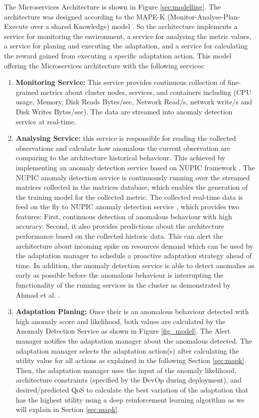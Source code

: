 \documentclass{ieeeaccess}
\begin{document}
The Microservices Architecture is shown in Figure \ref{sec:modelling}. The architecture was designed according to the MAPE-K (Monitor-Analyse-Plan-Execute over a shared Knowledge) model  \cite{computing2006architectural}. So the architecture  implements a service  for monitoring the environment, a service for analysing the metric values, a service for planing and executing the adaptation, and a service for calculating the reward gained from executing a specific adaptation action. This model offering the Microservices architecture with the following services: 
\begin{enumerate}
\item \textbf{Monitoring Service:} This service provides continuous collection of fine-grained metrics about cluster nodes, services, and containers including (CPU usage, Memory, Disk Reads Bytes/sec, Network Read/s, network write/s and Disk Writes Bytes/sec). The data are streamed into anomaly detection service at real-time. 
\item \textbf{Analysing Service: } this service is responsible for reading the collected observations and calculate how anomalous the current observation are comparing to the architecture historical behaviour. This achieved by implementing an anomaly detection service based on NUPIC framework \cite{AHMAD2017134}. The NUPIC anomaly detection service \cite{AHMAD2017134} is continuously running over the streamed matrices collected in the matrices database, which enables the generation of the training model for the collected metric.   The collected real-time data is feed on the fly to NUPIC anomaly detection service \cite{AHMAD2017134}, which provides two features: First, continuous detection of anomalous behaviour with high accuracy. Second, it also provides predictions about the architecture performance based on the collected historic data. This can alert the architecture about incoming spike on resources demand which can be used by the adaptation manager to schedule a proactive adaptation strategy ahead of time. In addition, the anomaly detection service is able to detect anomalies as early as possible before the anomalous behaviour is interrupting the functionality of the running services in the cluster as demonstrated by Ahmad et al. \cite{AHMAD2017134}. 
\item \textbf{Adaptation Planing: } Once their is an anomalous behaviour detected with high anomaly score and likelihood, both values are calculated by the Anomaly Detection Service as shown in Figure \ref{fig_model}. The Alert manager notifies the adaptation manager about the anomalous detected. The adaptation manager selects the adaptation action(s) after calculating the utility value for all actions as explained in the following Section \ref{sec:mapk}. Then, the adaptation manager uses the input of the anomaly likelihood, architecture constraints (specified by the DevOp during deployment), and desired/predicted QoS to calculate the best variation of the adaptation that has the highest utility using a deep reinforcement learning algorithm as we will explain in Section \ref{sec:mapk}. 

\end{enumerate}
\end{document}
